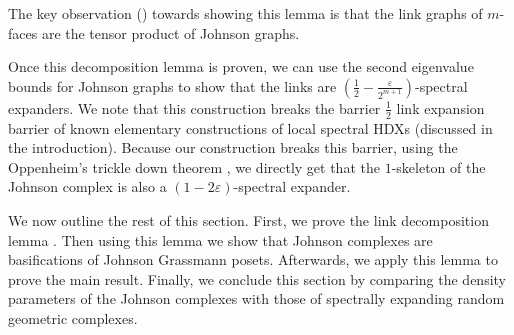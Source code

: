 The key observation () towards showing this lemma is that the link graphs of $m$-faces are the tensor product of Johnson graphs.

 
Once this decomposition lemma is proven, we can use the second eigenvalue bounds for Johnson graphs to show that the links are $\left(\frac{1}{2}-\frac{\varepsilon}{2^{m+1}}\right)$-spectral expanders. We note that this construction breaks the barrier $\frac{1}{2}$ link expansion barrier of known elementary constructions of local spectral HDXs (discussed in the introduction). Because our construction breaks this barrier, using the Oppenheim's trickle down theorem \cite{oppenheim2018local}, we 
 directly get that the $1$-skeleton of the Johnson complex is also a $(1-2\varepsilon)$-spectral expander. %

We now outline the rest of this section. First, we prove the link decomposition lemma . Then using this lemma we show that Johnson complexes are basifications of Johnson Grassmann posets. Afterwards, we apply this lemma to prove the main result. Finally, we conclude this section by comparing the density parameters of the Johnson complexes with those of spectrally expanding random geometric complexes.




